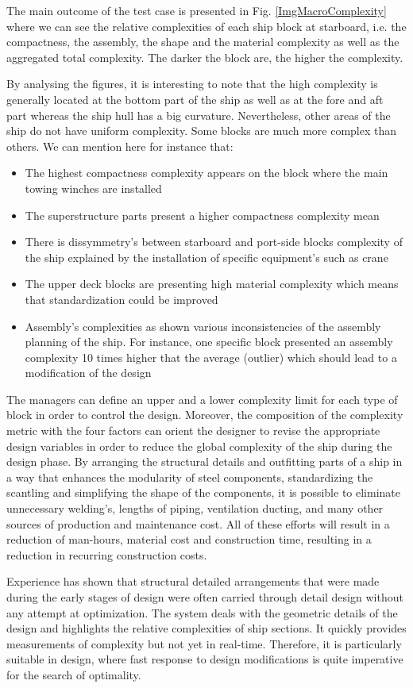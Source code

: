 The main outcome of the test case is presented in Fig. \ref{ImgMacroComplexity} where we can see the relative complexities of each ship block at starboard, i.e. the compactness, the assembly, the shape and the material complexity as well as the aggregated total complexity. The darker the block are, the higher the complexity.


By analysing the figures, it is interesting to note that the high complexity is generally located at the bottom part of the ship as well as at the fore and aft part whereas the ship hull has a big curvature. Nevertheless, other areas of the ship do not have uniform complexity. Some blocks are much more complex than others. We can mention here for instance that:
\begin{itemize}
\item The highest compactness complexity appears on the block where the main towing winches are installed
\item The superstructure parts present a higher compactness complexity mean
\item There is dissymmetry's between starboard and port-side blocks complexity of the ship explained by the installation of specific equipment's such as crane
\item The upper deck blocks are presenting high material complexity which means that standardization could be improved
\item Assembly's complexities as shown various inconsistencies of the assembly planning of the ship. For instance, one specific block presented an assembly complexity 10 times higher that the average (outlier) which should lead to a modification of the design
\end{itemize}


The managers can define an upper and a lower complexity limit for each type of block in order to control the design. Moreover, the composition of the complexity metric with the four factors can orient the designer to revise the appropriate design variables in order to reduce the global complexity of the ship during the design phase. By arranging the structural details and outfitting parts of a ship in a way that enhances the modularity of steel components, standardizing the scantling and simplifying the shape of the components, it is possible to eliminate unnecessary welding's, lengths of piping, ventilation ducting, and many other sources of production and maintenance cost. All of these efforts will result in a reduction of man-hours, material cost and construction time, resulting in a reduction in recurring construction costs.


Experience has shown that structural detailed arrangements that were made during the early stages of design were often carried through detail design without any attempt at optimization. The system deals with the geometric details of the design and highlights the relative complexities of ship sections. It quickly provides measurements of complexity but not yet in real-time. Therefore, it is particularly suitable in design, where fast response to design modifications is quite imperative for the search of optimality.
